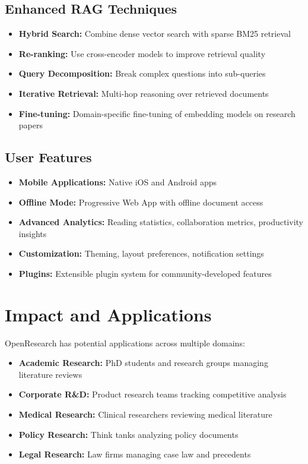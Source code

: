 \documentclass[12pt]{report}
\begin{document}
\subsection{Enhanced RAG Techniques}

\begin{itemize}
    \item \textbf{Hybrid Search:} Combine dense vector search with sparse BM25 retrieval
    \item \textbf{Re-ranking:} Use cross-encoder models to improve retrieval quality
    \item \textbf{Query Decomposition:} Break complex questions into sub-queries
    \item \textbf{Iterative Retrieval:} Multi-hop reasoning over retrieved documents
    \item \textbf{Fine-tuning:} Domain-specific fine-tuning of embedding models on research papers
\end{itemize}

\subsection{User Features}

\begin{itemize}
    \item \textbf{Mobile Applications:} Native iOS and Android apps
    \item \textbf{Offline Mode:} Progressive Web App with offline document access
    \item \textbf{Advanced Analytics:} Reading statistics, collaboration metrics, productivity insights
    \item \textbf{Customization:} Theming, layout preferences, notification settings
    \item \textbf{Plugins:} Extensible plugin system for community-developed features
\end{itemize}

\section{Impact and Applications}

OpenResearch has potential applications across multiple domains:

\begin{itemize}
    \item \textbf{Academic Research:} PhD students and research groups managing literature reviews
    \item \textbf{Corporate R\&D:} Product research teams tracking competitive analysis
    \item \textbf{Medical Research:} Clinical researchers reviewing medical literature
    \item \textbf{Policy Research:} Think tanks analyzing policy documents
    \item \textbf{Legal Research:} Law firms managing case law and precedents
\end{itemize}
\end{document}
